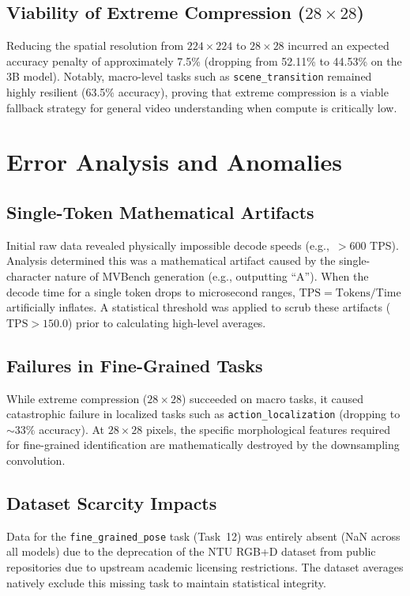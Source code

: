 \documentclass[conference]{IEEEtran}
\begin{document}
\subsection{Viability of Extreme Compression ($28\!\times\!28$)}
Reducing the spatial resolution from $224\!\times\!224$ to $28\!\times\!28$
incurred an expected accuracy penalty of approximately 7.5\% (dropping from
52.11\% to 44.53\% on the 3B model).
Notably, macro-level tasks such as \texttt{scene\_transition} remained highly
resilient (63.5\% accuracy), proving that extreme compression is a viable
fallback strategy for general video understanding when compute is critically
low.

\section{Error Analysis and Anomalies}

\subsection{Single-Token Mathematical Artifacts}
Initial raw data revealed physically impossible decode speeds
(e.g.,~$>600$ TPS).
Analysis determined this was a mathematical artifact caused by the
single-character nature of MVBench generation (e.g., outputting ``A'').
When the decode time for a single token drops to microsecond ranges,
$\mathrm{TPS} = \text{Tokens}/\text{Time}$ artificially inflates.
A statistical threshold was applied to scrub these artifacts
($\mathrm{TPS} > 150.0$) prior to calculating high-level averages.

\subsection{Failures in Fine-Grained Tasks}
While extreme compression ($28\!\times\!28$) succeeded on macro tasks, it
caused catastrophic failure in localized tasks such as
\texttt{action\_localization} (dropping to ${\sim}33\%$ accuracy).
At $28\!\times\!28$ pixels, the specific morphological features required for
fine-grained identification are mathematically destroyed by the downsampling
convolution.

\subsection{Dataset Scarcity Impacts}
Data for the \texttt{fine\_grained\_pose} task (Task~12) was entirely absent
(NaN across all models) due to the deprecation of the NTU RGB+D dataset from
public repositories due to upstream academic licensing restrictions.
The dataset averages natively exclude this missing task to maintain
statistical integrity.
\end{document}

